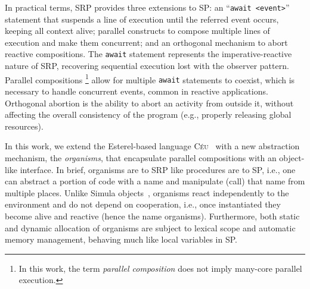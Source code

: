 \documentclass{acm_proc_article-sp}
\newcommand{\CEU}{\textsc{C\'{e}u}\xspace}
\newcommand{\code}[1] {{\small{\texttt{#1}}}}
\newcommand{\1}{\;}
\newcommand{\2}{\;\;}
\newcommand{\3}{\;\;\;}
\newcommand{\5}{\;\;\;\;\;}
\begin{document}
In practical terms, SRP provides three extensions to SP:
an ``\code{await <event>}'' statement that suspends a line of execution until 
the referred event occurs, keeping all context alive;
parallel constructs to compose multiple lines of execution and make them 
concurrent;
and an orthogonal mechanism to abort reactive compositions.
%
The \code{await} statement represents the imperative-reactive nature of SRP, 
recovering sequential execution lost with the observer pattern.
%
Parallel compositions%
\footnote{
In this work, the term \emph{parallel composition} does not imply many-core 
parallel execution.
}
allow for multiple \code{await} statements to coexist, which is necessary to 
handle concurrent events, common in reactive applications.
%
Orthogonal abortion is the ability to abort an activity from outside it, 
without affecting the overall consistency of the program (e.g., properly 
releasing global resources).

In this work, we extend the Esterel-based language \CEU~\cite{ceu.sensys13} 
with a new abstraction mechanism, the \emph{organisms}, that encapsulate 
parallel compositions with an object-like interface.
%
In brief, organisms are to SRP like procedures are to SP, i.e., one can 
abstract a portion of code with a name and manipulate (call) that name from 
multiple places.
%
Unlike Simula objects~\cite{simula}, organisms react independently to the 
environment and do not depend on cooperation, i.e., once instantiated they 
become alive and reactive (hence the name organisms).
%
Furthermore, both static and dynamic allocation of organisms are subject to 
lexical scope and automatic memory management, behaving much like local 
variables in SP.

\end{document}
